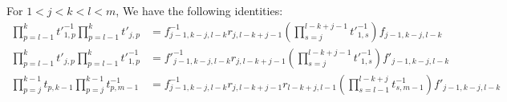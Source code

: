 \documentclass{amsart}
\begin{document}
\begin{prop}\label{prop:ftr_rels}
For $1<j<k<l<m$, We have the following identities:
\[
\begin{aligned}
\prod^{k}_{p=l-1}t'^{-1}_{1,p}\prod^{k}_{p=l-1}t'_{j,p}
&=f^{-1}_{j-1,k-j,l-k}r_{j,l-k+j-1}(\prod^{l-k+j-1}_{s=j} t'^{-1}_{1,s})f_{j-1,k-j,l-k}\\
\prod^{k}_{p=l-1}t'_{j,p}\prod^{k}_{p=l-1}t'^{-1}_{1,p}
&=f'^{-1}_{j-1,k-j,l-k}r_{j,l-k+j-1}(\prod^{l-k+j-1}_{s=j} t'^{-1}_{1,s})f'_{j-1,k-j,l-k}\\
\prod^{k-1}_{p=j}t_{p,k-1}\prod^{k-1}_{p=j}t^{-1}_{p,m-1}&=f^{-1}_{j-1,k-j,l-k}r_{j,l-k+j-1}r_{l-k+j,l-1}(\prod^{l-k+j}_{s=l-1} t^{-1}_{s,m-1})f'_{j-1,k-j,l-k}\\
\end{aligned}
\]
\end{prop}
\end{document}
